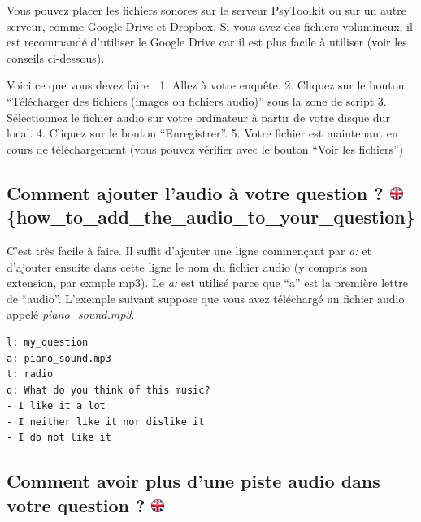 \documentclass[
]{book}
\begin{document}
Vous pouvez placer les fichiers sonores sur le serveur PsyToolkit ou sur
un autre serveur, comme Google Drive et Dropbox. Si vous avez des
fichiers volumineux, il est recommandé d'utiliser le Google Drive car il
est plus facile à utiliser (voir les conseils ci-dessous).

Voici ce que vous devez faire : 1. Allez à votre enquête. 2. Cliquez sur
le bouton ``Télécharger des fichiers (images ou fichiers audio)'' sous
la zone de script 3. Sélectionnez le fichier audio sur votre ordinateur
à partir de votre disque dur local. 4. Cliquez sur le bouton
``Enregistrer''. 5. Votre fichier est maintenant en cours de
téléchargement (vous pouvez vérifier avec le bouton ``Voir les
fichiers'')

\hypertarget{comment-ajouter-laudio-uxe0-votre-question-how_to_add_the_audio_to_your_question}{%
\subsection[Comment ajouter l'audio à votre question ?
\{how\_to\_add\_the\_audio\_to\_your\_question\}]{\texorpdfstring{Comment
ajouter l'audio à votre question ?
\href{https://www.psytoolkit.org/lessons/surveyaudiovideo.html\#_how_to_add_the_audio_to_your_question}{\protect\includegraphics{img/ukflag.png}}\{how\_to\_add\_the\_audio\_to\_your\_question\}}{Comment ajouter l'audio à votre question ? \{how\_to\_add\_the\_audio\_to\_your\_question\}}}\label{comment-ajouter-laudio-uxe0-votre-question-how_to_add_the_audio_to_your_question}}

C'est très facile à faire. Il suffit d'ajouter une ligne commençant par
\emph{a:} et d'ajouter ensuite dans cette ligne le nom du fichier audio
(y compris son extension, par exmple mp3). Le \emph{a:} est utilisé
parce que ``a'' est la première lettre de ``audio''. L'exemple suivant
suppose que vous avez téléchargé un fichier audio appelé
\emph{piano\_sound.mp3}.

\begin{verbatim}
l: my_question
a: piano_sound.mp3
t: radio
q: What do you think of this music?
- I like it a lot
- I neither like it nor dislike it
- I do not like it
\end{verbatim}

\hypertarget{comment-avoir-plus-dune-piste-audio-dans-votre-question}{%
\subsection[Comment avoir plus d'une piste audio dans votre question ?
]{\texorpdfstring{Comment avoir plus d'une piste audio dans votre
question ?
\href{https://www.psytoolkit.org/lessons/surveyaudiovideo.html\#_how_to_have_more_than_one_audio_track_in_your_question}{\protect\includegraphics{img/ukflag.png}}}{Comment avoir plus d'une piste audio dans votre question ? }}\label{comment-avoir-plus-dune-piste-audio-dans-votre-question}}
\end{document}
